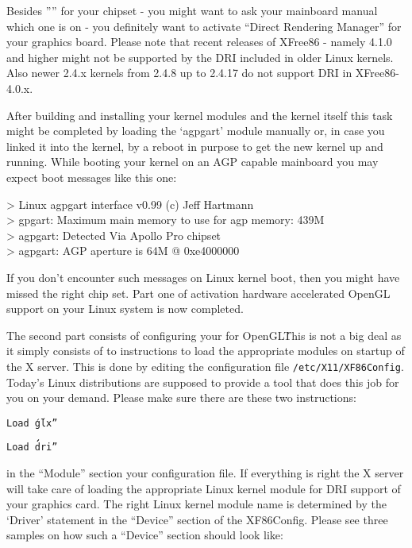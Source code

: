 Besides '''' for your chipset - you might want to ask
your mainboard manual which one is on - you definitely want to activate
``Direct Rendering Manager'' for your graphics board. Please note that
recent releases of XFree86 - namely 4.1.0 and higher might not be supported
by the DRI included in older Linux kernels. Also newer 2.4.x kernels from
2.4.8 up to 2.4.17 do not support DRI in XFree86-4.0.x.

After building and installing your kernel modules and the kernel itself this
task might be completed by loading the `agpgart' module manually or, in case
you linked it into the kernel, by a reboot in purpose to get the new kernel
up and running. While booting your kernel on an AGP capable mainboard you
may expect boot messages like this one:
\medskip

\begin{ttfamily}
\noindent
> Linux agpgart interface v0.99 (c) Jeff Hartmann\\
> gpgart: Maximum main memory to use for agp memory: 439M\\
> agpgart: Detected Via Apollo Pro chipset\\
> agpgart: AGP aperture is 64M @ 0xe4000000
\end{ttfamily}
\medskip

If you don't encounter such messages on Linux kernel boot, then you might
have missed the right chip set. Part one of activation hardware accelerated OpenGL support on your Linux system is now completed.

The second part consists of configuring your  for OpenGL\. This is
not a big deal as it simply consists of to instructions to load the
appropriate modules on startup of the X server.
This is done by editing the configuration file \texttt{/etc/X11/XF86Config}. Today's
Linux distributions are supposed to provide a tool that does this job for
you on your demand. Please make sure there are these two instructions:
\medskip


 \texttt{Load \'\'glx''}
 
 \texttt{Load \'\'dri''}
\medskip

\noindent
in the ``Module'' section your  configuration file. If everything is
right the X server will take care of loading the appropriate Linux kernel
module for DRI support of your graphics card. The right Linux kernel module
name is determined by the `Driver' statement in the ``Device'' section of the
XF86Config. Please see three samples on how such a ``Device'' section should
look like:
\medskip

